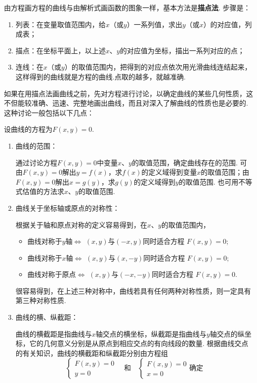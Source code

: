 由方程画方程的曲线与由解析式画函数的图象一样，基本方法是\textbf{描点法}. 步骤是：
\begin{enumerate}[(1)]
    \item 列表：在变量取值范围内，给$x$（或$y$）一系列值，求出$y$（或$x$）的对应值，列成表；
    \item 描点：在坐标平面上，以上述$x$、$y$的对应值为坐标，描出一系列对应的点；
    \item 连线：在$x$（或$y$）的取值范围内，把得到的对应点依次用光滑曲线连结起来，这样得到的曲线就是方程的曲线.点取的越多，就越准确.
\end{enumerate}

    如果在用描点法画曲线之前，先对方程进行讨论，以确定曲线的某些几何性质，这不但能较准确、迅速、完整地画出曲线，而且对深入了解曲线的性质也是必要的.这种讨论一般包括以下几点：

    设曲线的方程为$F(x,y)=0$.

\begin{enumerate}
    \item 曲线的范围：
    
    通过讨论方程$F(x,y)=0$中变量$x$、$y$的取值范围，确定曲线存在的范围. 可由$F(x,y)=0$解出$y=f(x)$，求$f(x)$的定义域得到变量$x$的取值范围；由$F(x,y)=0$解出$x=g(y)$，求$g(y)$的定义域得到$y$的取值范围. 也可用不等式估值的方法求$x$、$y$的取值范围.
    \item 曲线关于坐标轴或原点的对称性：
    
    根据关于轴和原点对称的定义容易得到，在$x$、$y$的取值范围内，
\begin{itemize}
    \item   曲线对称于$y$轴$\Longleftrightarrow$ $(x,y)$与$(-x,y)$同时适合方程
    $F(x,y)=0$;
    \item   曲线对称于$x$轴$\Longleftrightarrow$ $(x,y)$与$(x,-y)$同时适合方程
    $F(x,y)=0$;
    \item   曲线对称于原点$\Longleftrightarrow$ $(x,y)$与$(-x,-y)$同时适合方程
    $F(x,y)=0$.
\end{itemize}
  
很容易得到，在上述三种对称中，曲线若具有任何两种对称性质，则一定具有第三种对称性质.
\item 曲线的横、纵截距：

曲线的横截距是指曲线与$x$轴交点的横坐标，纵截距是指曲线与$y$轴交点的纵坐标，它的几何意义分别是从原点到相应交点的有向线段的数量. 根据曲线交点的有关知识，曲线的横截距和纵截距分别由方程组
\[\begin{cases}
    F(x,y)=0\\ y=0
\end{cases}\quad \text{和}\quad \begin{cases}
    F(x,y)=0\\ x=0
\end{cases}\text{确定}\]
\end{enumerate}

